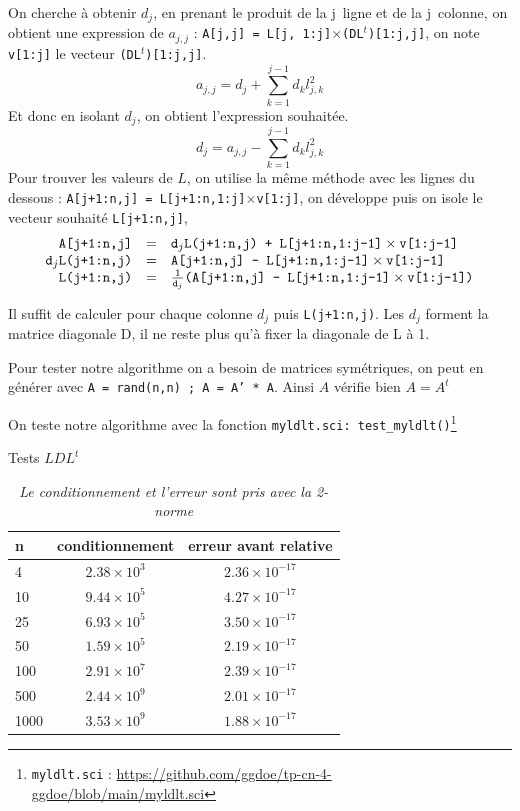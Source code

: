 \documentclass{article}
\begin{document}
On cherche à obtenir $d_j$, en prenant le produit de la j\ieme\ ligne et de la j\ieme\  colonne, on obtient une expression de $a_{j,j}$ :
\texttt{A[j,j] = L[j, 1:j]$\times$(DL$^t$)[1:j,j]}, on note \texttt{v[1:j]} le vecteur \texttt{(DL$^t$)[1:j,j]}.
\[
a_{j,j} = d_j + \sum_{k=1}^{j-1} d_k l^2_{j,k}
\]
Et donc en isolant $d_j$, on obtient l'expression souhaitée.
\[
d_j = a_{j,j} - \sum_{k=1}^{j-1} d_k l^2_{j,k}
\]
Pour trouver les valeurs de \(L\), on utilise la même méthode avec les lignes du dessous : \texttt{A[j+1:n,j] = L[j+1:n,1:j]$\times$v[1:j]}, on développe puis on isole le vecteur souhaité \texttt{L[j+1:n,j]},
\[
	\begin{array}{r c l}
	\texttt{A[j+1:n,j]} & = & \texttt{d}_j\texttt{L(j+1:n,j) + L[j+1:n,1:j-1]}\times \texttt{v[1:j-1]} \\
	\texttt{d}_j\texttt{L(j+1:n,j)} & = & \texttt{A[j+1:n,j] - L[j+1:n,1:j-1]}\times \texttt{v[1:j-1]}\\
	\texttt{L(j+1:n,j)} & = & \frac{1}{\texttt{d}_j}\texttt{(A[j+1:n,j] - L[j+1:n,1:j-1]}\times \texttt{v[1:j-1])} \\
	\end{array}
\]

Il suffit de calculer pour chaque colonne $d_j$ puis \texttt{L(j+1:n,j)}. Les $d_j$ forment la matrice diagonale D, il ne reste plus qu'à fixer la diagonale de L à 1.

Pour tester notre algorithme on a besoin de matrices symétriques, on peut en générer avec \texttt{A = rand(n,n) ; A = A' * A}.
Ainsi \(A\) vérifie bien \(A = A^t\)
\newline\indent

On teste notre algorithme avec la fonction \texttt{myldlt.sci: test\_myldlt()}\footnote{\texttt{myldlt.sci} : \href{https://github.com/ggdoe/tp-cn-4-ggdoe/blob/main/myldlt.sci}{https://github.com/ggdoe/tp-cn-4-ggdoe/blob/main/myldlt.sci}}

\begin{table}[H]
\renewcommand*\arraystretch{1.3}
\begin{center}
\caption{Tests \(LDL^t\)}
\begin{tabular}{|l|c|c|}
  \hline
  n & conditionnement & erreur avant relative \\
  \hline
	4	& \(2.38 \times 10^3\)	& \(2.36 \times 10^{-17}\) \\
	10	& \(9.44 \times 10^5\)	& \(4.27 \times 10^{-17}\) \\
	25	& \(6.93 \times 10^5\)	& \(3.50 \times 10^{-17}\) \\
	50	& \(1.59 \times 10^5\)	& \(2.19 \times 10^{-17}\) \\
	100	& \(2.91 \times 10^7\)	& \(2.39 \times 10^{-17}\) \\
	500	& \(2.44 \times 10^9\)	& \(2.01 \times 10^{-17}\) \\
	1000& \(3.53 \times 10^9\)	& \(1.88 \times 10^{-17}\) \\
  \hline
\end{tabular}
\caption*{\textit{Le conditionnement et l'erreur sont pris avec la 2-norme}}
\end{center}
\end{table}
\end{document}

